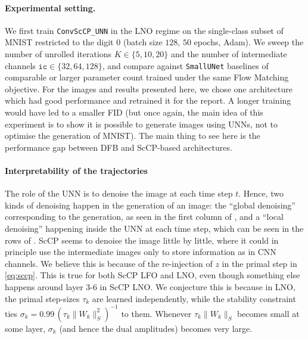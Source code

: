 \documentclass[a4paper,11pt]{article}
\theoremstyle{plain}{\theorembodyfont{\rmfamily}%
\newtheorem{proposition}[theorem]{Proposition}}
\theoremstyle{plain}{\theorembodyfont{\rmfamily}%
\newtheorem{notation}[theorem]{Notation}}
\theoremstyle{plain}{\theorembodyfont{\rmfamily}%
\newtheorem{assumption}[theorem]{Assumption}}
\theoremstyle{plain}{\theorembodyfont{\rmfamily}%
\newtheorem{problem}[theorem]{Problem}}
\theoremstyle{plain}{\theorembodyfont{\rmfamily}%
\newtheorem{example}[theorem]{Example}}
\theoremstyle{plain}{\theorembodyfont{\rmfamily}%
\newtheorem{remark}[theorem]{Remark}}
\theoremstyle{plain}{\theorembodyfont{\rmfamily}%
\newtheorem{definition}[theorem]{Definition}}
\theoremstyle{plain}{\theorembodyfont{\rmfamily}%
\newtheorem{question}[theorem]{Question}}
\numberwithin{equation}{section}
\begin{document}
\paragraph{Experimental setting.} We first train \texttt{ConvScCP\_UNN} in the LNO
regime on the single-class subset of MNIST restricted to the digit $0$ (batch size
$128$, $50$ epochs, Adam). We sweep the number of unrolled iterations
$K \in \{5,10,20\}$ and the number of intermediate channels
$\texttt{ic} \in \{32,64,128\}$, and compare against \texttt{SmallUNet}
baselines of comparable or larger parameter count trained under the same Flow
Matching objective. For the images and results presented here, we chose one architecture which had good performance and retrained it for the report. A longer training would have led to a smaller FID (but once again, the main idea of this experiment is to show it is possible to generate images using UNNs, not to optimise the generation of MNIST). The main thing to see here is the performance gap between DFB and ScCP-based architectures.

\paragraph{Interpretability of the trajectories}
\label{par:interp}

The role of the UNN is to denoise the image at each time step $t$. Hence, two kinds of denoising happen in the generation of an image: the ``global denoising'' corresponding to the generation, as seen in the first column of , and a ``local denoising'' happening inside the UNN at each time step, which can be seen in the rows of . ScCP seems to denoise the image little by little, where it could in principle use the intermediate images only to store information as in CNN channels. We believe this is because of the re-injection of $z$ in the primal step in \eqref{eq:sccp}. This is true for both ScCP LFO and LNO, even though something else happens around layer 3-6 in ScCP LNO. We conjecture this is because in LNO, the primal
step-sizes $\tau_k$ are learned independently, while the stability constraint
ties $\sigma_k = 0.99\,(\tau_k\|W_k\|_S^2)^{-1}$ to them. Whenever
$\tau_k \|W_k\|_S$ becomes small at some layer, $\sigma_k$ (and hence the
dual amplitudes) becomes very large.
\end{document}
